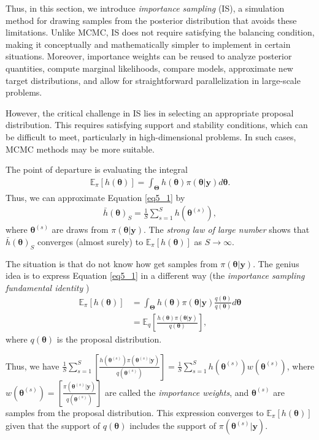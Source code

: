 Thus, in this section, we introduce \textit{importance sampling} (IS), a simulation method for drawing samples from the posterior distribution that avoids these limitations. Unlike MCMC, IS does not require satisfying the balancing condition, making it conceptually and mathematically simpler to implement in certain situations. Moreover, importance weights can be reused to analyze posterior quantities, compute marginal likelihoods, compare models, approximate new target distributions, and allow for straightforward parallelization in large-scale problems.

However, the critical challenge in IS lies in selecting an appropriate proposal distribution. This requires satisfying support and stability conditions, which can be difficult to meet, particularly in high-dimensional problems. In such cases, MCMC methods may be more suitable.

The point of departure is evaluating the integral
\begin{align}\label{eq5_1}
	\mathbb{E}_{\pi}[h(\bm{\theta})]=\int_{\bm{\Theta}} h(\bm{\theta}) \pi(\bm{\theta}|\bm{y})d\bm{\theta}.
\end{align}
Thus, we can approximate Equation \ref{eq5_1} by
\begin{align}\label{eq5_2}
	\bar{h}(\bm{\theta})_S=\frac{1}{S}\sum_{s=1}^S h(\bm{\theta}^{(s)}), 
\end{align}
where $\bm{\theta}^{(s)}$ are draws from $\pi(\bm{\theta}|\bm{y})$. The \textit{strong law of large number} shows that $\bar{h}(\bm{\theta})_S$ converges (almost surely) to $\mathbb{E}_{\pi}[h(\bm{\theta})]$ as $S\rightarrow\infty$.

The situation is that do not know how get samples from $\pi(\bm{\theta}|\bm{y})$. The genius idea is to express Equation \ref{eq5_1} in a different way (the \textit{importance sampling fundamental identity} \cite[Chap.~3]{robert2011monte})
\begin{align}\label{eq5_3}
	\mathbb{E}_{\pi}[h(\bm{\theta})]&=\int_{\bm{\Theta}} h(\bm{\theta}) \pi(\bm{\theta}|\bm{y})\frac{q(\bm{\theta})}{q(\bm{\theta})}d\bm{\theta}\\
	&=\mathbb{E}_{q}\left[\frac{h(\bm{\theta})\pi(\bm{\theta}|\bm{y})}{q(\bm{\theta})}\right],
\end{align}   
where $q(\bm{\theta})$ is the proposal distribution.

Thus, we have $\frac{1}{S}\sum_{s=1}^S \left[\frac{h(\bm{\theta}^{(s)})\pi(\bm{\theta}^{(s)}|\bm{y})}{q(\bm{\theta}^{(s)})}\right]= \frac{1}{S}\sum_{s=1}^S h(\bm{\theta}^{(s)})w(\bm{\theta}^{(s)})$, where $w(\bm{\theta}^{(s)})= \left[\frac{\pi(\bm{\theta}^{(s)}|\bm{y})}{q(\bm{\theta}^{(s)})}\right]$ are called the \textit{importance weights}, and $\bm{\theta}^{(s)}$ are samples from the proposal distribution. This expression converges to $\mathbb{E}_{\pi}[h(\bm{\theta})]$ given that the support of $q(\bm{\theta})$ includes the support of $\pi(\bm{\theta}^{(s)}|\bm{y})$.

